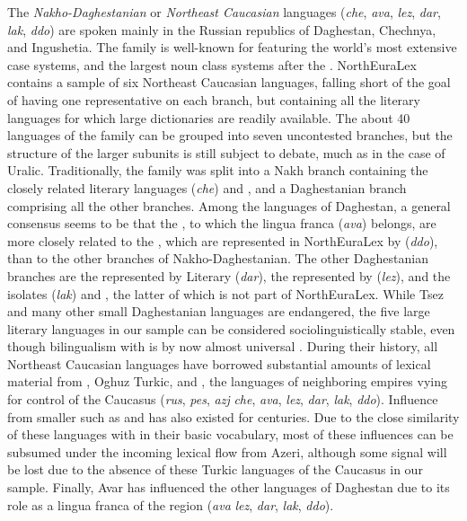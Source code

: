 The \textit{Nakho-Daghestanian} or \textit{Northeast Caucasian} languages (\textit{che}, \textit{ava}, \textit{lez}, \textit{dar}, \textit{lak}, \textit{ddo}) are spoken mainly in the Russian republics of Daghestan, Chechnya, and Ingushetia. The family is well-known for featuring the world's most extensive case systems, and the largest noun class systems after the . NorthEuraLex contains a sample of six Northeast Caucasian languages, falling short of the goal of having one representative on each branch, but containing all the literary languages for which large dictionaries are readily available. The about 40 languages of the family can be grouped into seven uncontested branches, but the structure of the larger subunits is still subject to debate, much as in the case of Uralic. Traditionally, the family was split into a Nakh branch containing the closely related literary languages  (\textit{che})
and , and a Daghestanian branch comprising all the other branches. Among the languages of Daghestan, a general consensus seems to be that the , to which the lingua franca  (\textit{ava}) belongs, are more closely related to the , which are represented in NorthEuraLex by  (\textit{ddo}), than to the other branches of Nakho-Daghestanian. The other Daghestanian branches are the  represented by Literary  (\textit{dar}), the  represented by  (\textit{lez}), and the isolates  (\textit{lak}) and , the latter of which is not part of NorthEuraLex. While Tsez and many other small Daghestanian languages are endangered, the five large literary languages in our sample can be considered sociolinguistically stable, even though bilingualism with  is by now almost universal \citep{hewitt2004}. During their history,
all Northeast Caucasian languages have borrowed substantial amounts of lexical material from , Oghuz Turkic, and , the languages of neighboring empires vying for control of the Caucasus (\textit{rus}, \textit{pes}, \textit{azj} \arrowLA \textit{che}, \textit{ava}, \textit{lez}, \textit{dar}, \textit{lak}, \textit{ddo}). Influence from smaller  such as  and  has also existed for centuries. Due to the close similarity of these languages with  in their basic vocabulary, most of these influences can be subsumed under the incoming lexical flow from Azeri, although some signal will be lost due to the absence of these Turkic languages of the Caucasus in our sample. Finally, Avar has influenced the other languages of Daghestan due to its role as a lingua franca of the region (\textit{ava} \arrowOA \textit{lez}, \textit{dar}, \textit{lak}, \textit{ddo}).

